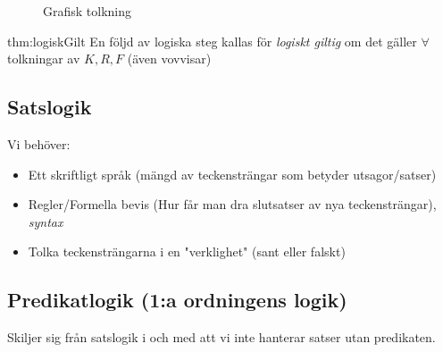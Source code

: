 \begin{figure}[ht]
    \centering
    \caption{Grafisk tolkning}
    \label{fig:grafisk-tolkning}
\end{figure}

\begin{theo}[Logiskt giltighet (Predikat-logik = 1:a ordningens logik)]{thm:logiskGilt}
  En följd av logiska steg kallas för \textit{logiskt giltig} om det gäller $\forall$ tolkningar av $K,R,F$ (även vovvisar)
\end{theo}
\newpage

\subsection{Satslogik}
\par\bigskip

Vi behöver:
\begin{itemize}
  \item Ett skriftligt språk (mängd av teckensträngar som betyder utsagor/satser)
  \item Regler/Formella bevis (Hur får man dra slutsatser av nya teckensträngar), \textit{syntax}
  \item Tolka teckensträngarna i en "verklighet" (sant eller falskt)
\end{itemize}


\subsection{Predikatlogik (1:a ordningens logik)}
Skiljer sig från satslogik i och med att vi inte hanterar satser utan predikaten.

